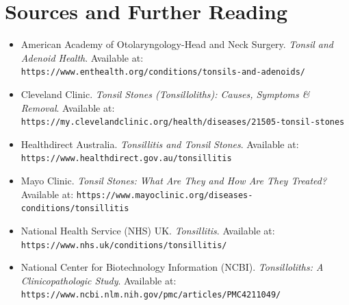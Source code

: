 \section*{Sources and Further Reading}
\begin{itemize}
    \item American Academy of Otolaryngology-Head and Neck Surgery. \textit{Tonsil and Adenoid Health}. Available at: \texttt{https://www.enthealth.org/conditions/tonsils-and-adenoids/}
    \item Cleveland Clinic. \textit{Tonsil Stones (Tonsilloliths): Causes, Symptoms \& Removal}. Available at: \texttt{https://my.clevelandclinic.org/health/diseases/21505-tonsil-stones}
    \item Healthdirect Australia. \textit{Tonsillitis and Tonsil Stones}. Available at: \texttt{https://www.healthdirect.gov.au/tonsillitis}
    \item Mayo Clinic. \textit{Tonsil Stones: What Are They and How Are They Treated?} Available at: \texttt{https://www.mayoclinic.org/diseases-conditions/tonsillitis}
    \item National Health Service (NHS) UK. \textit{Tonsillitis}. Available at: \texttt{https://www.nhs.uk/conditions/tonsillitis/}
    \item National Center for Biotechnology Information (NCBI). \textit{Tonsilloliths: A Clinicopathologic Study}. Available at: \texttt{https://www.ncbi.nlm.nih.gov/pmc/articles/PMC4211049/}
\end{itemize}